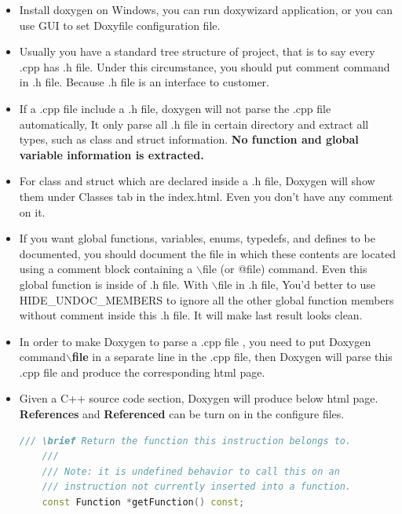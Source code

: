 \documentclass[a4paper,12pt,twoside]{book}
\begin{document}
\begin{itemize}
	\item Install doxygen on Windows, you can run doxywizard application, or you can use GUI to set Doxyfile configuration file.
	
	\item Usually you have a standard tree structure of project, that is to say every .cpp has .h file.  Under this circumstance, you should put comment command in .h file. Because .h file is an interface to customer.
	
	\item If a .cpp file include a .h file,  doxygen will not parse the .cpp file automatically, It only parse all .h file in certain directory and extract all types, such as class and struct information. \textbf{No function and global variable information is extracted.} 
	
	\item For class and struct which are declared inside a .h file, Doxygen will show them under Classes tab in the index.html. Even you don't have any comment on it.
	
	\item If you want global functions, variables, enums, typedefs, and defines to be documented, you should document the file in which these contents are located using a comment block containing a $\backslash$file (or @file) command. Even this global function is inside of .h file. With $\backslash$file in .h file, You'd better to use HIDE\_UNDOC\_MEMBERS to ignore all the other global function members without comment inside this .h file. It will make last result looks clean. 
	
	\item In order to make Doxygen to parse a .cpp file , you need to put Doxygen command\textbf{$\backslash$file} in a separate line in the .cpp file, then Doxygen will parse this .cpp file and produce the corresponding html page.
	
	\item Given a C++ source code section, Doxygen will produce below html page.  \textbf{References} and \textbf{Referenced} can be turn on in the configure files.
	
	\begin{lstlisting}[frame=single, language=c++]
	/// \brief Return the function this instruction belongs to.
	///
	/// Note: it is undefined behavior to call this on an
	/// instruction not currently inserted into a function.
	const Function *getFunction() const;
	\end{lstlisting}
	

\end{itemize}
\end{document}
